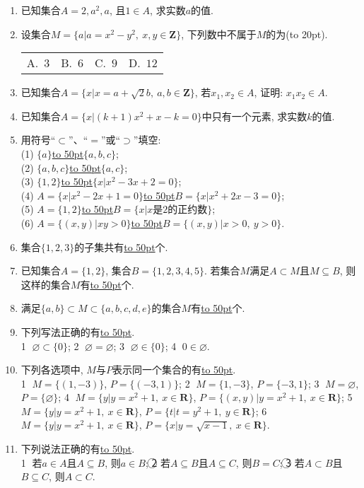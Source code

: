 \documentclass[10pt,a4paper]{article}
\newcommand{\blank}[1]{\underline{\hbox to #1pt{}}}
\newcommand{\bracket}[1]{(\hbox to #1pt{})}
\newcommand{\fourch}[4]{\par\begin{tabular}{p{.23\textwidth}p{.23\textwidth}p{.23\textwidth}p{.23\textwidth}}
A.~#1 &B.~#2& C.~#3& D.~#4
\end{tabular}}
\begin{document}
\begin{enumerate}[1.]
\item 已知集合$A={2, a^2, a}$, 且$1\in A$, 求实数$a$的值.
\item 设集合$M=\{a|a=x^2-y^2, \ x,y\in\mathbf{Z}\}$, 下列数中不属于$M$的为\bracket{20}.
\fourch{$3$}{$6$}{$9$}{$12$}
\item 已知集合$A=\{x|x=a+\sqrt 2b,\ a,b\in \mathbf{Z}\}$, 若$x_1,x_2\in A$, 证明: $x_1x_2\in A$.
\item 已知集合$A=\{x|(k+1)x^2+x-k=0\}$中只有一个元素, 求实数$k$的值.
\item 用符号``$\subset$''、``$=$''或``$\supset$''填空:\\
(1) $\{a\}$\blank{50}$\{a, b, c\}$;\\
(2) $\{a, b, c\}$\blank{50}$\{a, c\}$;\\
(3) $\{1, 2\}$\blank{50}$\{x|x^2-3x+2=0\}$;\\
(4) $A=\{x|x^2-2x+1=0\}$\blank{50}$B=\{x|x^2+2x-3=0\}$;\\
(5) $A=\{1, 2\}$\blank{50}$B=\{x|x$是$2$的正约数$\}$;\\
(6) $A=\{(x, y)|xy>0\}$\blank{50}$B=\{(x, y)|x>0, \ y>0\}$.
\item  集合$\{1,2,3\}$的子集共有\blank{50}个.
\item 已知集合$A=\{1,2\}$, 集合$B=\{1,2,3,4,5\}$. 若集合$M$满足$A\subset M$且$M\subseteq B$, 则这样的集合$M$有\blank{50}个.
\item 满足$\{a, b\}\subset M \subset\{a, b, c, d, e\}$的集合$M$有\blank{50}个.
\item 下列写法正确的有\blank{50}.\\
\textcircled{1} $\varnothing\subset\{0\}$; \textcircled{2} $\varnothing=\varnothing$; \textcircled{3} $\varnothing\in\{0\}$; \textcircled{4} $0\in\varnothing$.
\item 下列各选项中, $M$与$P$表示同一个集合的有\blank{50}.\\
\textcircled{1} $M=\{(1, -3)\}$, $P=\{(-3, 1)\}$; \textcircled{2} $M=\{1, -3\}$, $P=\{-3, 1\}$; \textcircled{3} $M=\varnothing$, $P=\{\varnothing\}$; \textcircled{4} $M=\{y|y=x^2+1, \  x\in\mathbf{R}\}$, $P=\{(x, y)|y=x^2+1, \ x\in\mathbf{R}\}$; \textcircled{5} $M=\{y|y=x^2+1, \  x\in\mathbf{R}\}$, $P=\{t|t=y^2+1, \ y\in\mathbf{R}\}$; \textcircled{6} $M=\{y|y=x^2+1, \  x\in\mathbf{R}\}$, $P=\{x|y=\sqrt{x-1},\  x\in\mathbf{R}\}$.
\item 下列说法正确的有\blank{50}.\\
\textcircled{1} 若$a\in A$且$A\subseteq B$, 则$a\in B$; \textcircled{2} 若$A\subseteq B$且$A\subseteq C$, 则$B=C$; \textcircled{3} 若$A\subset B$且$B\subseteq C$, 则$A\subset C$.

\end{enumerate}
\end{document}
